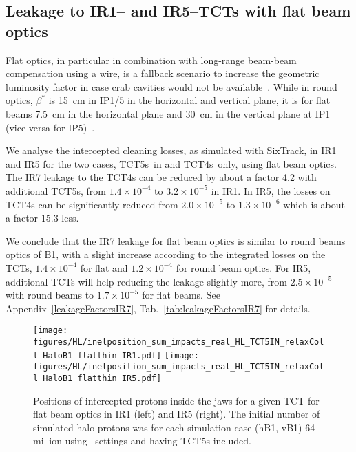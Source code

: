 
\subsection{Leakage to IR1-- and IR5--TCTs with flat beam optics}

Flat optics, in particular in combination with long-range beam-beam compensation using a wire, is a fallback scenario to increase the geometric luminosity factor in case crab cavities would not be available~\cite{flatRef}. While in round optics, $\beta^*$ is 15~cm in IP1/5 in the horizontal and vertical plane, it is for flat beams 7.5~cm in the horizontal plane and 30~cm in the vertical plane at IP1 (vice versa for IP5)~\cite{opticsWebRef}. 

We analyse the intercepted cleaning losses, as simulated with SixTrack, in IR1 and IR5 for the two cases, TCT5s~in and TCT4s~only, using flat beam optics. The IR7 leakage to the TCT4s can be reduced by about a factor 4.2 with additional TCT5s, from $1.4 \times 10^{-4}$ to $3.2 \times 10^{-5}$ in IR1. In IR5, the losses on TCT4s can be significantly reduced from $2.0 \times 10^{-5}$ to $1.3 \times 10^{-6}$ which is about a factor 15.3 less. 

We conclude that the IR7 leakage for flat beam optics is similar to round beams optics of B1, with a slight increase according to the integrated losses on the TCTs, $1.4 \times 10^{-4}$ for flat and $1.2 \times 10^{-4}$ for round beam optics. For IR5, additional TCTs will help reducing the leakage slightly more, from $2.5 \times 10^{-5}$ with round beams to $1.7 \times 10^{-5}$ for flat beams. See Appendix~\ref{leakageFactorsIR7}, Tab.~\ref{tab:leakageFactorsIR7} for details.


\begin{figure}%
\begin{center}
  \texttt{[image: figures/HL/inelposition\_sum\_impacts\_real\_HL\_TCT5IN\_relaxColl\_HaloB1\_flatthin\_IR1.pdf]}
  \texttt{[image: figures/HL/inelposition\_sum\_impacts\_real\_HL\_TCT5IN\_relaxColl\_HaloB1\_flatthin\_IR5.pdf]}
\end{center}
 \caption{Positions of intercepted protons inside the jaws for a given TCT for flat beam optics in IR1 (left) and IR5 (right). The initial number of simulated halo protons was for each simulation case (hB1, vB1) 64 million using \twosigmaret~settings and having TCT5s included.
   \label{fig:inelflat}}
\end{figure}
